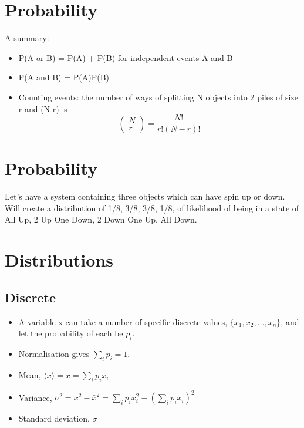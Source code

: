 \documentclass[a4paper, 11pt, normalem]{report}
\begin{document}
\section{Probability}
A summary:
\begin{itemize}
    \item P(A or B) = P(A) + P(B) for independent events A and B
    \item P(A and B) = P(A)P(B)
    \item Counting events: the number of ways of splitting N objects into 2 piles of size r and (N-r) is
        \begin{equation}
            \begin{pmatrix} N \\ r \end{pmatrix} = \frac{N!}{r!(N-r)!}
        \end{equation}
\end{itemize}

\section{Probability}
Let's have a system containing three objects which can have spin up or down.
Will create a distribution of 1/8, 3/8, 3/8, 1/8, of likelihood of being in a state of All Up, 2 Up One Down, 2 Down One Up, All Down.

\section{Distributions}
\subsection{Discrete}
\begin{itemize}
    \item A variable x can take a number of specific discrete values, $\{x_1, x_2, \dots, x_n\}$, and let the probability of each be $p_i$.
    \item Normalisation gives $\sum_i p_i = 1$.
    \item Mean, $\langle x\rangle = \bar{x} = \sum_i p_ix_i$.
    \item Variance, $\sigma^2 = \bar{x^2} - \bar{x}^2 = \sum_i p_ix_i^2 - \left(\sum_i p_ix_i\right)^2$
    \item Standard deviation, $\sigma$
\end{itemize}
\end{document}
